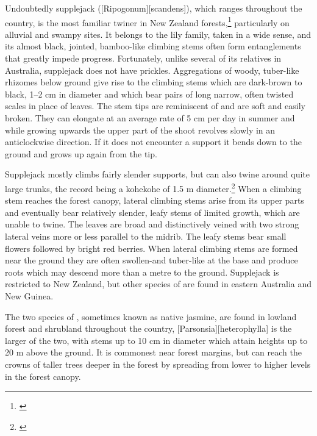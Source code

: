 Undoubtedly supplejack ([Ripogonum][scandens]), which ranges throughout the country, is the most familiar twiner in New Zealand forests,\footnote{\cite{macmillan1973biological}} particularly on alluvial and swampy sites.
It belongs to the lily family, taken in a wide sense, and its almost black, jointed, bamboo-like climbing stems often form entanglements that greatly impede progress.
Fortunately, unlike several of its relatives in Australia, supplejack does not have prickles.
Aggregations of woody, tuber-like rhizomes below ground give rise to the climbing stems which are dark-brown to black, 1--2 cm in diameter and which bear pairs of long narrow, often twisted scales in place of leaves.
The stem tips are reminiscent of  and are soft and easily broken.
They can elongate at an average rate of 5 cm per day in summer and while growing upwards the upper part of the shoot revolves slowly in an anticlockwise direction.
If it does not encounter a support it bends down to the ground and grows up again from the tip.

Supplejack mostly climbs fairly slender supports, but can also twine around quite large trunks, the record being a kohekohe of 1.5 m diameter.\footnote{\cite{macmillan1973biological}}
When a climbing stem reaches the forest canopy, lateral climbing stems arise from its upper parts and eventually bear relatively slender, leafy stems of limited growth, which are unable to twine.
The leaves are broad and distinctively veined with two strong lateral veins more or less parallel to the midrib.
The leafy stems bear small flowers followed by bright red berries.
When lateral climbing stems are formed near the ground they are often swollen-and tuber-like at the base and produce roots which may descend more than a metre to the ground.
Supplejack is restricted to New Zealand, but other species of  are found in eastern Australia and New Guinea.

The two species of , sometimes known as native jasmine, are found in lowland forest and shrubland throughout the country, [Parsonsia][heterophylla] is the larger of the two, with stems up to 10 cm in diameter which attain heights up to 20 m above the ground.
It is commonest near forest margins, but can reach the crowns of taller trees deeper in the forest by spreading from lower to higher levels in the forest canopy.

